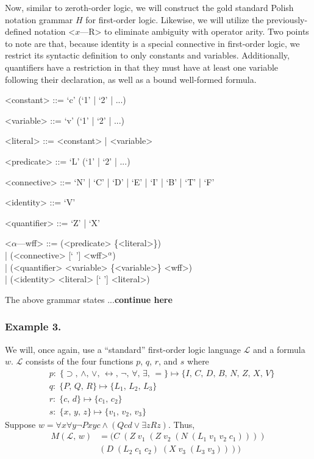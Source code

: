 \documentclass[ms]{uncgdissertationexp2}
\theoremstyle{plain}
\theoremstyle{definition}
\theoremstyle{remark}
\begin{document}
Now, similar to zeroth-order logic, we will construct the gold standard Polish notation grammar $H$ for first-order logic. Likewise, we will utilize the previously-defined notation \textless{$x$---R\textgreater} to eliminate ambiguity with operator arity. Two points to note are that, because identity is a special connective in first-order logic, we restrict its syntactic definition to only constants and variables. Additionally, quantifiers have a restriction in that they must have at least one variable following their declaration, as well as a bound well-formed formula.
\begin{grammar}
	
	<constant> ::= `c' (`1' | `2' | ...)
	
	<variable> ::= `v' (`1' | `2' | ...)
	
	<literal> ::= <constant> | <variable>
	
	<predicate> ::= `L' (`1' | `2' | ...)
	
	<connective> ::= `N' | `C' | `D' | `E' | `I' | `B' | `T' | `F'
	
	<identity> ::= `V'
	
	<quantifier> ::= `Z' | `X'
	
	<$\alpha$---wff> ::= (<predicate> \{<literal>\}) \\| (<connective> [` '] <wff>$^{\alpha}$) \\| (<quantifier> <variable> \{<variable>\} <wff>)\\| (<identity> <literal> [` '] <literal>)
\end{grammar}
The above grammar states ...\textbf{continue here}
\subsubsection{Example 3.} We will, once again, use a ``standard'' first-order logic language $\mathcal{L}$ and a formula $w$. $\mathcal{L}$ consists of the four functions $p$, $q$, $r$, and $s$ where
\begin{align*}
	  & p:\;\{\supset,\,\land,\,\lor,\,\leftrightarrow,\,\lnot,\,\forall,\,\exists,\,=\}\mapsto \{I,\,C,\,D,\,B,\,N,\,Z,\,X,\,V\} \\
	  & q:\;\{P,\,Q,\,R\} \mapsto \{L_{1},\,L_{2},\,L_{3}\}                                                                       \\
	  & r:\;\{c,\,d\} \mapsto \{c_1,\,c_2\}                                                                                       \\
	  & s:\;\{x,\,y,\,z\} \mapsto \{v_1,\,v_2,\,v_3\}                                                                             
\end{align*}
Suppose $w = \forall{x}\forall{y}\lnot{Pxyc} \land (Qcd \lor \exists{z}Rz)$. Thus,
\begin{align*}
	M(\mathcal{L},\,w) & = (C\;(Z\;v_1\;(Z\;v_2\;(N\;(L_1\;v_1\;v_2\;c_1)))) \\
	                   & (D\;(L_2\;c_1\;c_2)\;(X\;v_3\;(L_3\;v_3))))         \\
\end{align*}
\end{document}
